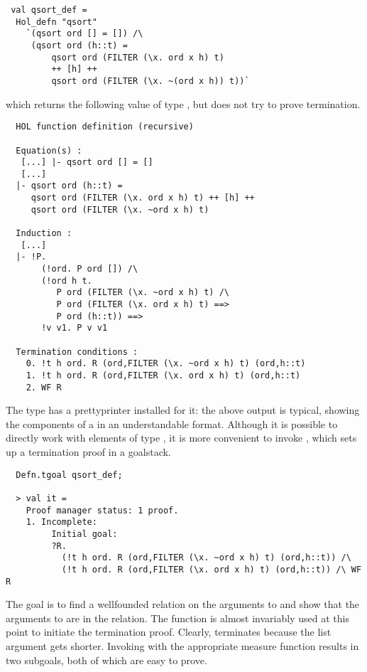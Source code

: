 \setcounter{sessioncount}{0}
\begin{session}
\begin{verbatim}
 val qsort_def =
  Hol_defn "qsort"
    `(qsort ord [] = []) /\
     (qsort ord (h::t) =
         qsort ord (FILTER (\x. ord x h) t)
         ++ [h] ++
         qsort ord (FILTER (\x. ~(ord x h)) t))`
\end{verbatim}
\end{session}
which returns the following value of type , but does not try
to prove termination.
\begin{session}
\begin{verbatim}
  HOL function definition (recursive)

  Equation(s) :
   [...] |- qsort ord [] = []
   [...]
  |- qsort ord (h::t) =
     qsort ord (FILTER (\x. ord x h) t) ++ [h] ++
     qsort ord (FILTER (\x. ~ord x h) t)

  Induction :
   [...]
  |- !P.
       (!ord. P ord []) /\
       (!ord h t.
          P ord (FILTER (\x. ~ord x h) t) /\
          P ord (FILTER (\x. ord x h) t) ==>
          P ord (h::t)) ==>
       !v v1. P v v1

  Termination conditions :
    0. !t h ord. R (ord,FILTER (\x. ~ord x h) t) (ord,h::t)
    1. !t h ord. R (ord,FILTER (\x. ord x h) t) (ord,h::t)
    2. WF R
\end{verbatim}
\end{session}

The type  has a prettyprinter installed for it: the above
output is typical, showing the components of a  in an understandable
format. Although it is possible to directly work with elements of
type \ml{defn}, it is more convenient to invoke
\ml{Defn.tgoal}, which sets up a termination proof in a goalstack.
%
\begin{session}
\begin{verbatim}
  Defn.tgoal qsort_def;

  > val it =
    Proof manager status: 1 proof.
    1. Incomplete:
         Initial goal:
         ?R.
           (!t h ord. R (ord,FILTER (\x. ~ord x h) t) (ord,h::t)) /\
           (!t h ord. R (ord,FILTER (\x. ord x h) t) (ord,h::t)) /\ WF R
\end{verbatim}
\end{session}
%
The goal is to find a wellfounded relation on the arguments to 
and show that the arguments to  are in the relation.
The function  is almost invariably used at this point to
initiate the termination proof. Clearly,  terminates because the list
argument gets shorter. Invoking \ml{WF\_REL\_TAC} with the appropriate
measure function results in two subgoals, both of which are easy to
prove.

